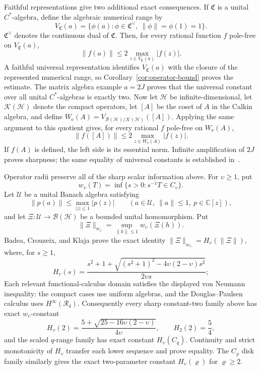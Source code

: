 \documentclass[preprints,article,submit,oneauthor]{Definitions/mdpi}
\theoremstyle{mdpi}
\theoremstyle{definition}
\newcommand{\C}{\mathbb C}
\begin{document}
Faithful representations give two additional exact consequences.  If
$\mathfrak C$ is a unital $C^*$-algebra, define the algebraic numerical
range by
\[
  V_{\mathfrak C}(a)=
  \{\phi(a):\phi\in\mathfrak C^\vee,
  \ \lVert\phi\rVert=\phi(1)=1\}.
\]
$\mathfrak C^\vee$ denotes the continuous dual of $\mathfrak C$.
Then, for every
rational function $f$ pole-free on $V_{\mathfrak C}(a)$,
\begin{equation}
  \lVert f(a)\rVert\leq
  2\max_{z\in V_{\mathfrak C}(a)}\lvert f(z)\rvert.
  \label{eq:Cstar-discussion}
\end{equation}
A faithful universal representation identifies
$V_{\mathfrak C}(a)$ with the closure of the represented numerical
range, so Corollary~\ref{cor:operator-bound} proves the estimate.
The matrix algebra example $a=2J$ proves that the universal constant
over all unital $C^*$-algebras is exactly two.  Now let $\mathcal H$
be infinite-dimensional, let $\mathcal K(\mathcal H)$ denote the
compact operators, let $[A]$ be the coset of $A$ in the Calkin
algebra, and define
$W_{\mathrm e}(A)=V_{\mathcal B(\mathcal H)/\mathcal K(\mathcal H)}([A])$.
Applying the same argument to this quotient gives, for every rational
$f$ pole-free on $W_{\mathrm e}(A)$,
\[
  \lVert f([A])\rVert\leq
  2\max_{z\in W_{\mathrm e}(A)}\lvert f(z)\rvert.
\]
If $f(A)$ is defined, the left side is its essential norm.  Infinite
amplification of $2J$ proves sharpness; the same equality of universal
constants is established in~\cite{BlazhkoEtAl2025}.

Operator radii preserve all of the sharp scalar information above.
For $\upsilon\geq1$, put
\[
 w_\upsilon(T)=\inf\{s>0:s^{-1}T\in C_\upsilon\}.
\]
Let $\mathcal U$ be a unital Banach algebra satisfying
\[
  \lVert p(a)\rVert\leq
  \max_{\lvert z\rvert\leq1}\lvert p(z)\rvert
  \qquad(a\in\mathcal U,\ \lVert a\rVert\leq1,\ p\in\C[z]),
\]
and let $\Xi\colon\mathcal U\to\mathcal B(\mathcal H)$ be a bounded
unital homomorphism.  Put
\[
 \lVert\Xi\rVert_{w_\upsilon}
 =\sup_{\lVert h\rVert\leq1}w_\upsilon(\Xi(h)).
\]
Badea, Crouzeix, and Klaja prove the exact identity
\cite{BadeaCrouzeixKlaja2018}
$\lVert\Xi\rVert_{w_\upsilon}=H_\upsilon(\lVert\Xi\rVert)$, where, for
$s\geq1$,
\begin{equation}
  H_\upsilon(s)=
  \frac{s^2+1+
  \sqrt{(s^2+1)^2-4\upsilon(2-\upsilon)s^2}}
  {2\upsilon s};
  \label{eq:operator-radius-conversion-discussion}
\end{equation}
Each relevant functional-calculus domain satisfies the displayed von
Neumann inequality: the compact cases use uniform algebras, and the
Douglas--Paulsen calculus uses $H^\infty(\mathcal R_\delta)$.  Consequently
every sharp constant-two family above has exact
$w_\upsilon$-constant
\begin{equation}
  H_\upsilon(2)=
  \frac{5+\sqrt{25-16\upsilon(2-\upsilon)}}{4\upsilon},
  \qquad H_2(2)=\frac54,
  \label{eq:operator-radius-discussion}
\end{equation}
and the scaled $q$-range family has exact constant $H_\upsilon(C_q)$.
Continuity and strict monotonicity of $H_\upsilon$ transfer each lower
sequence and prove equality.  The $C_\varrho$ disk family similarly
gives the exact two-parameter constant $H_\upsilon(\varrho)$ for
$\varrho\geq2$.
\end{document}
